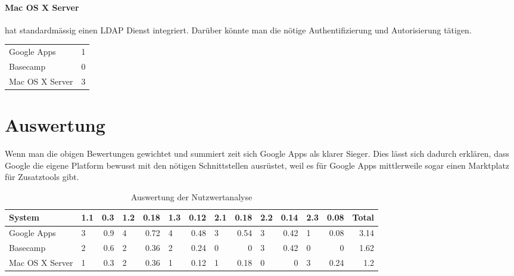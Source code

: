 \paragraph{Mac OS X Server}
\label{par:2.3Mac OS X Server}
hat standardmässig einen LDAP Dienst integriert. Darüber könnte man die nötige Authentifizierung und Autorisierung tätigen.

\begin{tabular}{lc}
Google Apps & 1\\
Basecamp & 0\\
Mac OS X Server & 3\\
\end{tabular}

\section{Auswertung}
\label{sec:Auswertung}
Wenn man die obigen Bewertungen gewichtet und summiert zeit sich Google Apps als klarer Sieger. Dies lässt sich dadurch erklären, dass Google die eigene Platform bewusst mit den nötigen Schnittstellen ausrüstet, weil es für Google Apps mittlerweile sogar einen Marktplatz für Zusatztools gibt.

\begin{table}[h!]
  \centering
  \begin{tabular}{|l|lr|lr|lr|lr|lr|lr|r|}
  \hline
  System & 1.1 & 0.3 & 1.2 & 0.18 & 1.3 & 0.12 & 2.1 & 0.18 & 2.2 & 0.14 & 2.3 & 0.08 & Total\\
  \hline
  Google Apps & 3 & 0.9 & 4 & 0.72 & 4 & 0.48 & 3 & 0.54 & 3 & 0.42 & 1 & 0.08 & 3.14\\
  \hline
  Basecamp & 2 & 0.6 & 2 & 0.36 & 2 & 0.24 & 0 & 0 & 3 & 0.42 & 0 & 0 & 1.62\\
  \hline
  Mac OS X Server & 1 & 0.3 & 2 & 0.36 & 1 & 0.12 & 1 & 0.18 & 0 & 0 & 3 & 0.24 & 1.2\\
  \hline
  \end{tabular}
  \caption{Auswertung der Nutzwertanalyse}
  \label{tab:auswertung_nutzwertanalyse}
\end{table}